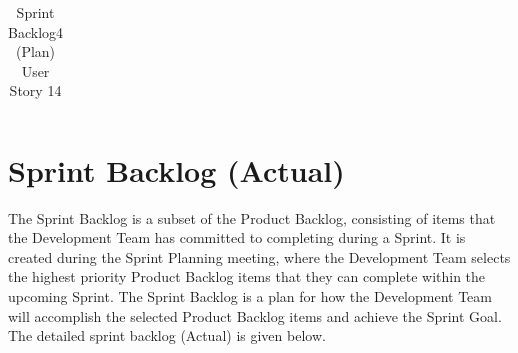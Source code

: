 \documentclass[12pt]{report}
\begin{document}
\begin{table}[h]
{\begin{tabular}{|cc|ccccc|}
\end{tabular}
}
\caption{Sprint Backlog4 (Plan) User Story 14}
\label{tab:mytable}
\end{table}



\section{Sprint Backlog (Actual)}

The Sprint Backlog is a subset of the Product Backlog, consisting of items that the Development Team has committed to completing during a Sprint. It is created during the Sprint Planning meeting, where the Development Team selects the highest priority Product Backlog items that they can complete within the upcoming Sprint. The Sprint Backlog is a plan for how the Development Team will accomplish the selected Product Backlog items and achieve the Sprint Goal. The detailed sprint backlog (Actual) is given below.
\newline
\end{document}
